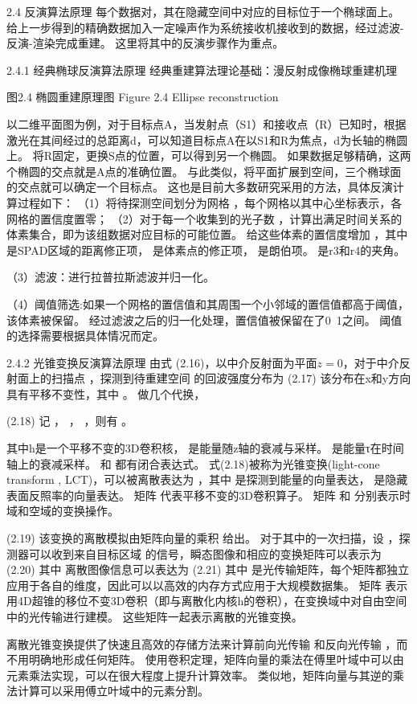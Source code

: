 2.4  反演算法原理
每个数据对，其在隐藏空间中对应的目标位于一个椭球面上。
给上一步得到的精确数据加入一定噪声作为系统接收机接收到的数据，经过滤波-反演-渲染完成重建。
这里将其中的反演步骤作为重点。

2.4.1 经典椭球反演算法原理
经典重建算法理论基础：漫反射成像椭球重建机理 
 
图2.4  椭圆重建原理图
Figure 2.4 Ellipse reconstruction

以二维平面图为例，对于目标点A，当发射点（S1）和接收点（R）已知时，根据激光在其间经过的总距离d，可以知道目标点A在以S1和R为焦点，d为长轴的椭圆上。
将R固定，更换S点的位置，可以得到另一个椭圆。
如果数据足够精确，这两个椭圆的交点就是A点的准确位置。
与此类似，将平面扩展到空间，三个椭球面的交点就可以确定一个目标点。
这也是目前大多数研究采用的方法，具体反演计算过程如下：
（1）将待探测空间划分为网格 ，每个网格以其中心坐标表示，各网格的置信度置零；
（2）对于每一个收集到的光子数 ，计算出满足时间关系的体素集合，即为该组数据对应目标的可能位置。
给这些体素的置信度增加 ，其中 是SPAD区域的距离修正项， 是体素点的修正项， 是朗伯项。
 是r3和r4的夹角。

（3）滤波：进行拉普拉斯滤波并归一化。

（4）阈值筛选:如果一个网格的置信值和其周围一个小邻域的置信值都高于阈值，该体素被保留。
经过滤波之后的归一化处理，置信值被保留在了0~1之间。
阈值的选择需要根据具体情况而定。

2.4.2 光锥变换反演算法原理
由式 (2.16)，以中介反射面为平面$z=0$，对于中介反射面上的扫描点  ，探测到待重建空间 的回波强度分布为
  	(2.17)
该分布在x和y方向具有平移不变性，其中 。
做几个代换，  
  
  	(2.18)
记 ， ，  ，则有 。

其中h是一个平移不变的3D卷积核， 是能量随z轴的衰减与采样。
  是能量τ在时间轴上的衰减采样。
 和 都有闭合表达式。
式(2.18)被称为光锥变换(light-cone transform , LCT)，可以被离散表达为 ，其中 是探测到能量的向量表达，  是隐藏表面反照率的向量表达。
矩阵 代表平移不变的3D卷积算子。
矩阵 和 分别表示时域和空域的变换操作。

	  	(2.19)
该变换的离散模拟由矩阵向量的乘积 给出。
对于其中的一次扫描，设  ，探测器可以收到来自目标区域 的信号，瞬态图像和相应的变换矩阵可以表示为
	  	(2.20)
其中  
离散图像信息可以表达为
	  	(2.21)
其中 是光传输矩阵，每个矩阵都独立应用于各自的维度，因此可以以高效的内存方式应用于大规模数据集。
矩阵 表示用4D超锥的移位不变3D卷积（即与离散化内核h的卷积），在变换域中对自由空间中的光传输进行建模。
这些矩阵一起表示离散的光锥变换。

离散光锥变换提供了快速且高效的存储方法来计算前向光传输 和反向光传输 ，而不用明确地形成任何矩阵。
 使用卷积定理，矩阵向量的乘法在傅里叶域中可以由元素乘法实现，可以在很大程度上提升计算效率。
类似地，矩阵向量与其逆的乘法计算可以采用傅立叶域中的元素分割。

